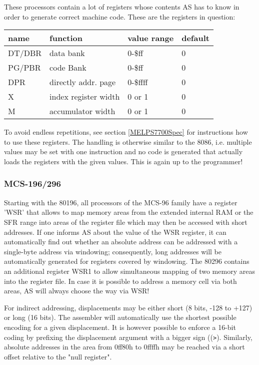 \documentclass[12pt,twoside]{report}
\newcommand{\asname}{{AS}}
\begin{document}
These processors contain a lot of registers whose contents \asname{} has to know
in order to generate correct machine code.  These are the registers
in question:
\begin{center}\begin{tabular}{|l|l|l|l|}
\hline
name   & function             & value range   & default \\
\hline
\hline
DT/DBR & data bank            & 0-\$ff        &  0 \\
PG/PBR & code Bank            & 0-\$ff        &  0 \\
DPR    & directly addr. page  & 0-\$ffff      &  0 \\
X      & index register width & 0 or 1        &  0 \\
M      & accumulator width    & 0 or 1        &  0 \\
\hline
\end{tabular}\end{center}
\par
To avoid endless repetitions, see section \ref{MELPS7700Spec} for
instructions how to use these registers.  The handling is otherwise
similar to the 8086, i.e. multiple values may be set with one instruction
and no code is generated that actually loads the registers with the given
values.  This is again up to the programmer!


\subsubsection{MCS-196/296}

Starting with the 80196, all processors of the MCS-96 family have a
register 'WSR' that allows to map memory areas from the extended
internal RAM or the SFR range into areas of the register file which
may then be accessed with short addresses.  If one informs \asname{} about
the value of the WSR register, it can automatically find out whether
an absolute address can be addressed with a single-byte address via
windowing; consequently, long addresses will be automatically generated
for registers covered by windowing.  The 80296 contains an additional
register WSR1 to allow simultaneous mapping of two memory areas into
the register file.  In case it is possible to address a memory cell
via both areas, \asname{} will always choose the way via WSR!

For indirect addressing, displacements may be either short (8 bits,
-128 to +127) or long (16 bits).  The assembler will automatically
use the shortest possible encoding for a given displacement.  It
is however possible to enforce a 16-bit coding by prefixing the
displacement argument with a bigger sign ((\verb!>!).  Similarly,
absolute addresses in the area from 0ff80h to 0ffffh may be reached
via a short offset relative to the "null register".
\end{document}
